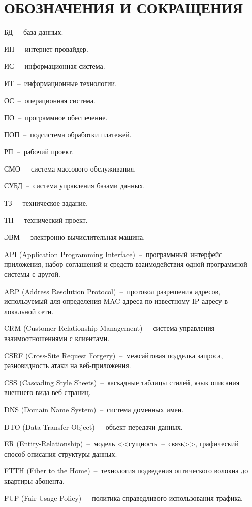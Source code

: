 \section*{ОБОЗНАЧЕНИЯ И СОКРАЩЕНИЯ}

БД~--~база данных.

ИП~--~интернет-провайдер.

ИС~--~информационная система.

ИТ~--~информационные технологии.

ОС~--~операционная система.

ПО~--~программное обеспечение.

ПОП~--~подсистема обработки платежей.

РП~--~рабочий проект.

СМО~--~система массового обслуживания.

СУБД~--~система управления базами данных.

ТЗ~--~техническое задание.

ТП~--~технический проект.

ЭВМ~--~электронно-вычислительная машина.

API (Application Programming Interface)~--~программный интерфейс приложения, набор соглашений и средств взаимодействия одной программной системы с другой.

ARP (Address Resolution Protocol)~--~протокол разрешения адресов, используемый для определения MAC-адреса по известному IP-адресу в локальной сети.

CRM (Customer Relationship Management)~--~система управления взаимоотношениями с клиентами.

CSRF (Cross-Site Request Forgery)~--~межсайтовая подделка запроса, разновидность атаки на веб-приложения.

CSS (Cascading Style Sheets)~--~каскадные таблицы стилей, язык описания внешнего вида веб-страниц.

DNS (Domain Name System)~--~система доменных имен.

DTO (Data Transfer Object)~--~объект передачи данных.

ER (Entity-Relationship)~--~модель <<сущность~--~связь>>, графический способ описания структуры данных.

FTTH (Fiber to the Home)~--~технология подведения оптического волокна до квартиры абонента.

FUP (Fair Usage Policy)~--~политика справедливого использования трафика.

